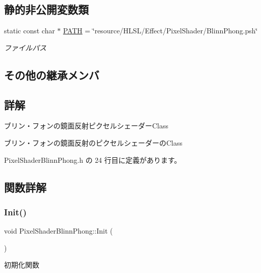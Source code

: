 \subsection*{静的非公開変数類}
\begin{DoxyCompactItemize}
\item 
static const char $\ast$ \mbox{\hyperlink{class_pixel_shader_blinn_phong_a23dbaf1801f99d9275b87f63ca58069d}{P\+A\+TH}} = \char`\"{}resource/H\+L\+SL/Effect/Pixel\+Shader/Blinn\+Phong.\+psh\char`\"{}
\begin{DoxyCompactList}\small\item\em ファイルパス \end{DoxyCompactList}\end{DoxyCompactItemize}
\subsection*{その他の継承メンバ}


\subsection{詳解}
ブリン・フォンの鏡面反射ピクセルシェーダー\+Class 

ブリン・フォンの鏡面反射のピクセルシェーダーの\+Class 

 Pixel\+Shader\+Blinn\+Phong.\+h の 24 行目に定義があります。



\subsection{関数詳解}
\mbox{\label{class_pixel_shader_blinn_phong_af02b6b6659975f0285aebced953c567a}} 
\subsubsection{\texorpdfstring{Init()}{Init()}}
{\footnotesize\ttfamily void Pixel\+Shader\+Blinn\+Phong\+::\+Init (\begin{DoxyParamCaption}{ }\end{DoxyParamCaption})\hspace{0.3cm}{\ttfamily [virtual]}}



初期化関数 


